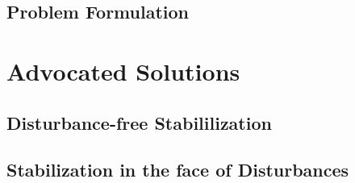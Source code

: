 \documentclass[a4paper,11pt,twoside]{book}
\begin{document}
  \chapter{Problem Formulation}
    \label{chapter:prob_formulation}

    
    
    
    
    \cleardoublepage


\part{Advocated Solutions}
\label{part:advocated_solutions}
    \cleardoublepage

  \chapter{Disturbance-free Stabililization}
    \label{chapter:stabilization_without_disturbance}

    
    
    
    
    \cleardoublepage

  \chapter{Stabilization in the face of Disturbances}
    \label{chapter:stabilization_with_disturbance}

    
    
    
    
    \cleardoublepage
\end{document}
